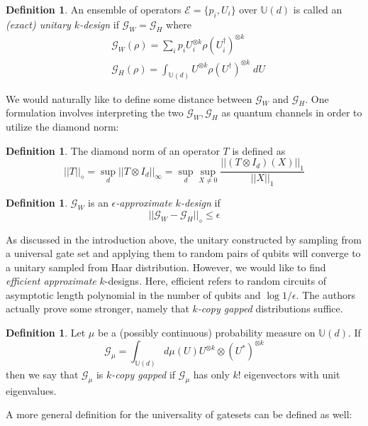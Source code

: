 \documentclass[12pt]{amsart}
\theoremstyle{definition}
\newtheorem{definition}[theorem]{Definition}
\theoremstyle{remark}
\numberwithin{equation}{section}
\theoremstyle{remark}
\begin{document}
\begin{definition}
  An ensemble of operators $\mathcal{E} = \{p_i, U_i\}$ over $\mathbb{U}(d)$ is called an \emph{(exact) unitary $k$-design} if $\mathcal{G}_W = \mathcal{G}_H$ where
  \begin{align}
    & \mathcal{G}_W(\rho) = \sum_{i} p_i U_i^{\otimes k}\rho (U_i^{\dagger})^{\otimes k} \\
    & \mathcal{G}_H(\rho) = \int_{\mathbb{U}(d)} U^{\otimes k} \rho (U^\dagger)^{\otimes k} \; dU
  \end{align}
\end{definition}
%
 We would naturally like to define some distance between $\mathcal{G}_W$ and $\mathcal{G}_H$. One formulation involves interpreting the two $\mathcal{G}_W, \mathcal{G}_H$ as quantum channels in order to utilize the diamond norm:
%
\begin{definition}
  The diamond norm of an operator $T$ is defined as
  $$||T||_{\diamond} = \sup_d ||T \otimes I_d ||_{\infty} = \sup_d \sup_{X \neq 0} \frac{||(T \otimes I_d)(X)||_1}{||X||_1}$$
\end{definition}
%
\begin{definition}
  $\mathcal{G}_W$ is an \emph{$\epsilon$-approximate $k$-design} if
  \begin{equation}
    ||\mathcal{G}_W - \mathcal{G}_H ||_{\diamond}  \leq \epsilon
  \end{equation}
\end{definition}
%
As discussed in the introduction above, the unitary constructed by sampling from a universal gate set and applying them to random pairs of qubits will converge to a unitary sampled from Haar distribution. However, we would like to find \emph{efficient approximate} $k$-designs. Here, efficient refers to random circuits of asymptotic length polynomial in the number of qubits and $\log 1/\epsilon$. The authors actually prove some stronger, namely that \emph{$k$-copy gapped} distributions suffice.
%
\begin{definition} \label{gappeddef}
  Let $\mu$ be a (possibly continuous) probability measure on $\mathbb{U}(d)$. If
  \begin{equation}
    \mathcal{G}_{\mu} = \int_{\mathbb{U}(d)} d\mu(U) U^{\otimes k} \otimes (U^*)^{\otimes k}
  \end{equation}
  then we say that $\mathcal{G}_\mu$ is \emph{$k$-copy gapped} if $\mathcal{G}_\mu$ has only $k!$ eigenvectors with unit eigenvalues.
\end{definition}
%
\noindent A more general definition for the universality of gatesets can be defined as well:
\end{document}

